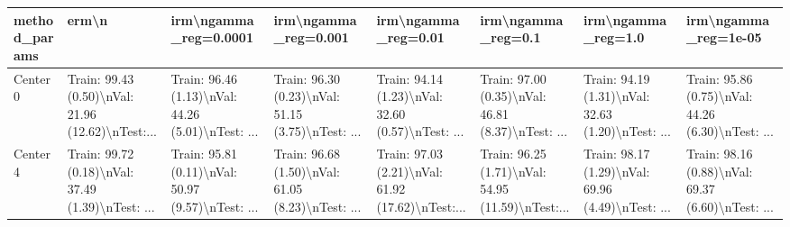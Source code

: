 \begin{tabular}{llllllll}
\toprule
method\_params &                                              erm\textbackslash n &                              irm\textbackslash ngamma\_reg=0.0001 &                               irm\textbackslash ngamma\_reg=0.001 &                                irm\textbackslash ngamma\_reg=0.01 &                                 irm\textbackslash ngamma\_reg=0.1 &                                 irm\textbackslash ngamma\_reg=1.0 &                               irm\textbackslash ngamma\_reg=1e-05 \\
\midrule
Center 0 &  Train: 99.43 (0.50)\textbackslash nVal: 21.96 (12.62)\textbackslash nTest:... &  Train: 96.46 (1.13)\textbackslash nVal: 44.26 (5.01)\textbackslash nTest: ... &  Train: 96.30 (0.23)\textbackslash nVal: 51.15 (3.75)\textbackslash nTest: ... &  Train: 94.14 (1.23)\textbackslash nVal: 32.60 (0.57)\textbackslash nTest: ... &  Train: 97.00 (0.35)\textbackslash nVal: 46.81 (8.37)\textbackslash nTest: ... &  Train: 94.19 (1.31)\textbackslash nVal: 32.63 (1.20)\textbackslash nTest: ... &  Train: 95.86 (0.75)\textbackslash nVal: 44.26 (6.30)\textbackslash nTest: ... \\
Center 4 &  Train: 99.72 (0.18)\textbackslash nVal: 37.49 (1.39)\textbackslash nTest: ... &  Train: 95.81 (0.11)\textbackslash nVal: 50.97 (9.57)\textbackslash nTest: ... &  Train: 96.68 (1.50)\textbackslash nVal: 61.05 (8.23)\textbackslash nTest: ... &  Train: 97.03 (2.21)\textbackslash nVal: 61.92 (17.62)\textbackslash nTest:... &  Train: 96.25 (1.71)\textbackslash nVal: 54.95 (11.59)\textbackslash nTest:... &  Train: 98.17 (1.29)\textbackslash nVal: 69.96 (4.49)\textbackslash nTest: ... &  Train: 98.16 (0.88)\textbackslash nVal: 69.37 (6.60)\textbackslash nTest: ... \\
\bottomrule
\end{tabular}

